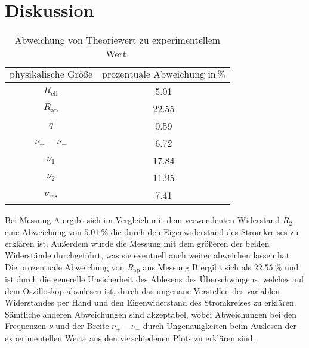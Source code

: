 \section{Diskussion}
\label{sec:Diskussion}

\begin{table}[h]
  \centering
  \label{tab:abw}
  \begin{tabular}{ c c }
    \toprule
   $\text{physikalische Größe}$
   &{$\text{prozentuale Abweichung}\,\, \text{in} \, \si{\percent} $} \\

    \midrule
    $R_{\text{eff}}$ & 5.01 \\
    $R_{\text{ap}}$& 22.55  \\
    $q$ & 0.59 \\
    $\nu_{+}-\nu_{-}$ & 6.72 \\
    $\nu_{\text{1}}$ & 17.84\\
    $\nu_{\text{2}}$ & 11.95 \\
    $\nu_{\text{res}}$ & 7.41\\
    \bottomrule
  \end{tabular}
  \caption{Abweichung von Theoriewert zu experimentellem Wert.}
\end{table}

Bei Messung A ergibt sich im Vergleich mit dem verwendenten Widerstand $R_{\text{2}}$
eine Abweichung von $\SI{5.01}{\percent}$ die durch den Eigenwiderstand des Stromkreises zu erklären ist.
Außerdem wurde die Messung mit dem größeren der beiden Widerstände durchgeführt, was sie
eventuell auch weiter abweichen lassen hat.
Die prozentuale Abweichung von $R_{\text{ap}}$ aus Messung B ergibt sich als
$\SI{22.55}{\percent}$ und ist durch die generelle Unsicherheit des Ablesens des Überschwingens, welches auf dem
Oszilloskop abzulesen ist, durch das ungenaue Verstellen des variablen Widerstandes per Hand
und den Eigenwiderstand des Stromkreises zu erklären.
Sämtliche anderen Abweichungen sind akzeptabel, wobei Abweichungen bei den Frequenzen
$\nu$ und der Breite $\nu_{+}-\nu_{-}$ durch Ungenauigkeiten beim Auslesen der
experimentellen Werte aus den verschiedenen Plots zu erklären sind.
